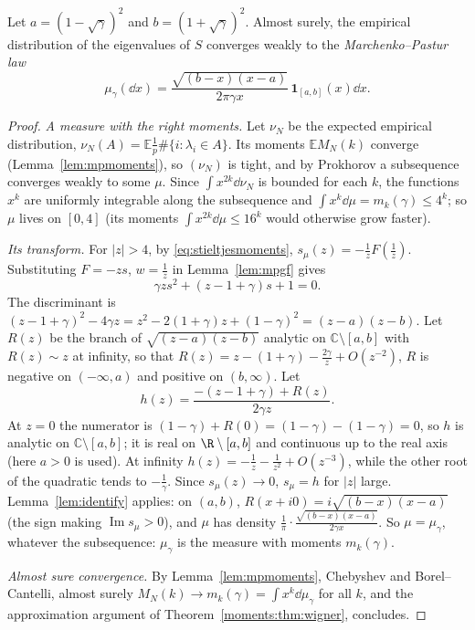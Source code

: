 \begin{theorem}\label{thm:mp}
Let $a=(1-\sqrt\gamma)^2$ and $b=(1+\sqrt\gamma)^2$. Almost surely, the empirical distribution of the eigenvalues of $S$ converges weakly to the \emph{Marchenko--Pastur law}
\[
\mu_\gamma(\dd x)=\frac{\sqrt{(b-x)(x-a)}}{2\pi\gamma x}\,\mathbf 1_{[a,b]}(x)\dd x.
\]
\end{theorem}

\begin{proof}
\emph{A measure with the right moments.} Let $\nu_N$ be the expected empirical distribution, $\nu_N(A)=\mathbb E\frac1p\#\{i:\lambda_i\in A\}$. Its moments $\mathbb EM_N(k)$ converge (Lemma~\ref{lem:mpmoments}), so $(\nu_N)$ is tight, and by
Prokhorov a subsequence converges weakly to some $\mu$. Since $\int x^{2k}\dd\nu_N$ is bounded for each $k$, the functions $x^k$ are uniformly integrable along the subsequence and $\int x^k\dd\mu=m_k(\gamma)\le4^k$; so $\mu$
lives on $[0,4]$ (its moments $\int x^{2k}\dd\mu\le16^k$ would otherwise grow faster).

\emph{Its transform.} For $|z|>4$, by \eqref{eq:stieltjesmoments}, $s_\mu(z)=-\frac1zF(\frac1z)$. Substituting $F=-zs$, $w=\frac1z$ in Lemma~\ref{lem:mpgf} gives
\[
\gamma zs^2+(z-1+\gamma)s+1=0.
\]
The discriminant is $(z-1+\gamma)^2-4\gamma z=z^2-2(1+\gamma)z+(1-\gamma)^2=(z-a)(z-b)$. Let $R(z)$ be the branch of $\sqrt{(z-a)(z-b)}$ analytic on $\mathbb C\setminus[a,b]$ with $R(z)\sim z$ at infinity, so that
$R(z)=z-(1+\gamma)-\frac{2\gamma}z+O(z^{-2})$, $R$ is negative on $(-\infty,a)$ and positive on $(b,\infty)$. Let
\[
h(z)=\frac{-(z-1+\gamma)+R(z)}{2\gamma z}.
\]
At $z=0$ the numerator is $(1-\gamma)+R(0)=(1-\gamma)-(1-\gamma)=0$, so $h$ is analytic on $\mathbb C\setminus[a,b]$; it is real on $\R\setminus[a,b]$ and continuous up to the real axis (here $a>0$ is used). At infinity
$h(z)=-\frac1z-\frac1{z^2}+O(z^{-3})$, while the other root of the quadratic tends to $-\frac1\gamma$. Since $s_\mu(z)\to0$, $s_\mu=h$ for $|z|$ large. Lemma~\ref{lem:identify} applies: on $(a,b)$, $R(x+i0)=i\sqrt{(b-x)(x-a)}$
(the sign making $\operatorname{Im}s_\mu>0$), and $\mu$ has density $\frac1\pi\cdot\frac{\sqrt{(b-x)(x-a)}}{2\gamma x}$. So $\mu=\mu_\gamma$, whatever the subsequence: $\mu_\gamma$ is the measure with moments $m_k(\gamma)$.

\emph{Almost sure convergence.} By Lemma~\ref{lem:mpmoments}, Chebyshev and Borel--Cantelli, almost surely $M_N(k)\to m_k(\gamma)=\int x^k\dd\mu_\gamma$ for all $k$, and the approximation argument of Theorem~\ref{moments:thm:wigner}, concludes.
\end{proof}

